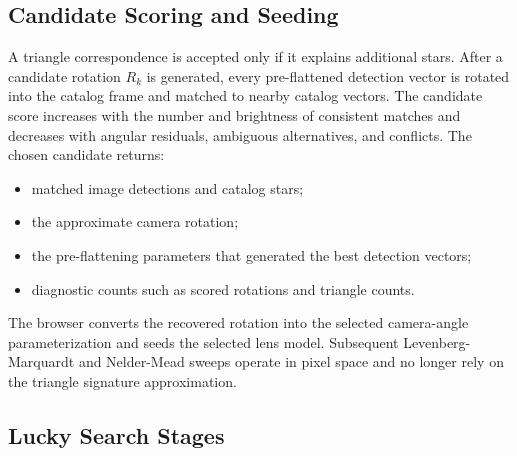 \documentclass[11pt]{article}
\begin{document}
\subsection{Candidate Scoring and Seeding}

A triangle correspondence is accepted only if it explains additional stars.
After a candidate rotation \(R_k\) is generated, every pre-flattened detection
vector is rotated into the catalog frame and matched to nearby catalog vectors.
The candidate score increases with the number and brightness of consistent
matches and decreases with angular residuals, ambiguous alternatives, and
conflicts. The chosen candidate returns:
\begin{itemize}
  \item matched image detections and catalog stars;
  \item the approximate camera rotation;
  \item the pre-flattening parameters that generated the best detection
        vectors;
  \item diagnostic counts such as scored rotations and triangle counts.
\end{itemize}
The browser converts the recovered rotation into the selected camera-angle
parameterization and seeds the selected lens model. Subsequent Levenberg-Marquardt and
Nelder-Mead sweeps operate in pixel space and no longer rely on the triangle
signature approximation.

\subsection{Lucky Search Stages}
\end{document}
